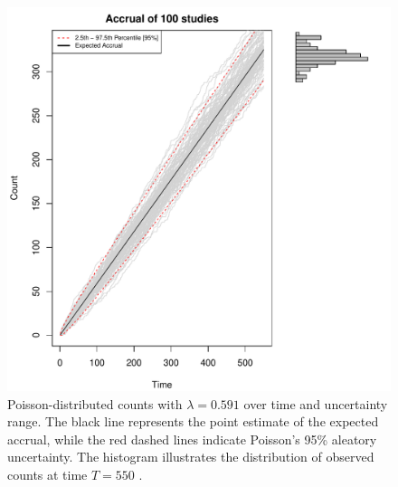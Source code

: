 \begin{figure}
\begin{knitrout}
\color{fgcolor}

{\centering \includegraphics[width=\textwidth-3cm]{figure/ch02_figunnamed-chunk-3-1} 

}


\end{knitrout}
  \caption{Poisson-distributed counts with $\lambda = 0.591$ over time and uncertainty range. The black line represents the point estimate of the expected accrual, while the red dashed lines indicate Poisson's 95\% aleatory uncertainty. The histogram illustrates the distribution of observed counts at time $T = 550$ \citep{spiegelhalter2011visualizing, pkgacc}.}
  \label{fig:2_2}
\end{figure}


